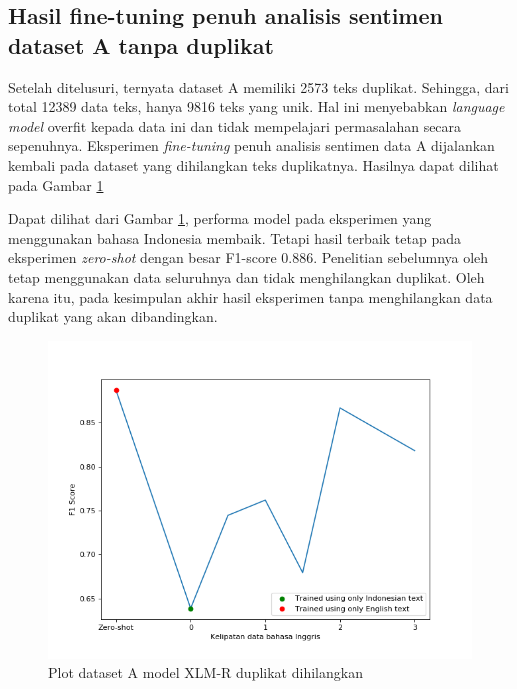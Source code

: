     \subsection{Hasil fine-tuning penuh analisis sentimen dataset A tanpa duplikat}
        Setelah ditelusuri, ternyata dataset A memiliki 2573 teks duplikat. Sehingga, dari total 12389 data teks, hanya 9816 teks yang unik. Hal ini menyebabkan \textit{language model} overfit kepada data ini dan tidak mempelajari permasalahan secara sepenuhnya. Eksperimen \textit{fine-tuning} penuh analisis sentimen data A dijalankan kembali pada dataset yang dihilangkan teks duplikatnya. Hasilnya dapat dilihat pada Gambar \ref{fig:plot_fuLL_trip_duplicate}

        

        Dapat dilihat dari Gambar \ref{fig:plot_fuLL_trip_duplicate}, performa model pada eksperimen yang menggunakan bahasa Indonesia membaik. Tetapi hasil terbaik tetap pada eksperimen \textit{zero-shot} dengan besar F1-score 0.886. Penelitian sebelumnya oleh \parencite{FarhanKhodra2017} tetap menggunakan data seluruhnya dan tidak menghilangkan duplikat. Oleh karena itu, pada kesimpulan akhir hasil eksperimen tanpa menghilangkan data duplikat yang akan dibandingkan.
    
        \begin{figure}[!t]
            \centering
            \includegraphics[width=0.9\linewidth]{resources/plot-full-trip-advisor-xlmr-duplicate.png}
            \caption{Plot dataset A model XLM-R duplikat dihilangkan}\label{fig:plot_fuLL_trip_duplicate}
        \end{figure}
